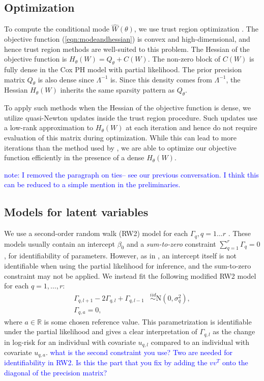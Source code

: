 \documentclass[]{article}
\newcommand{\alex}[1]{\textcolor{blue}{#1}}
\begin{document}
\subsection{Optimization}\label{subsec:opt}

To compute the conditional mode $\hat{W}(\theta)$, we use trust region optimization \citep{trustoptim}. The objective function (\ref{eqn:modeandhessian}) is convex and high-dimensional, and hence trust region methods are well-suited to this problem. The Hessian of the objective function is $H_{\theta}(W) = Q_{\theta} + C(W)$. The non-zero block of $C(W)$ is fully dense in the Cox PH model with partial likelihood. The prior precision matrix $Q_{\theta}$ is also dense since $\Lambda^{-1}$ is. Since this density comes from $\Lambda^{-1}$, the Hessian $H_{\theta}(W)$ inherits the same sparsity pattern as $Q_{\theta}$.

To apply such methods when the Hessian of the objective function is dense, we utilize quasi-Newton updates inside the trust region procedure. Such updates use a low-rank approximation to $H_{\theta}(W)$ at each iteration and hence do not require evaluation of this matrix during optimization. While this can lead to more iterations than the method used by \citet{casecross}, we are able to optimize our objective function efficiently in the presence of a dense $H_{\theta}(W)$. 


\alex{note: I removed the paragraph on ties-- see our previous conversation. I think this can be reduced to a simple mention in the preliminaries.}

\subsection{Models for latent variables}

We use a second-order random walk (RW2) model for each $\Gamma_{q},q = 1\ldots r$ \citep{rw2}. These models usually contain an intercept $\beta_{0}$ and a \emph{sum-to-zero} constraint $\sum_{q=1}^{r}\Gamma_{q} = 0$, for identifiability of parameters. However, as in \citet{casecross}, an intercept itself is not identifiable when using the partial likelihood for inference, and the sum-to-zero constraint may not be applied. We instead fit the following modified RW2 model for each $q = 1,\ldots,r$:
\begin{equation}\begin{aligned}\label{eqn:rw2}
\Gamma_{q,l+1} - 2\Gamma_{q,l} + \Gamma_{q,l-1} &\overset{iid}{\sim}\text{N}\left( 0,\sigma^{2}_{q}\right), \\
\Gamma_{q,a} = 0,
\end{aligned}\end{equation}
where $a\in\mathbb{R}$ is some chosen reference value. This parametrization is identifiable under the partial likelihood and gives a clear interpretation of $\Gamma_{q,l}$ as the change in log-risk for an individual with covariate $u_{q,l}$ compared to an individual with covariate $u_{q,a}$. \alex{what is the second constraint you use? Two are needed for identifiability in RW2. Is this the part that you fix by adding the $vv^{T}$ onto the diagonal of the precision matrix?}
\end{document}
